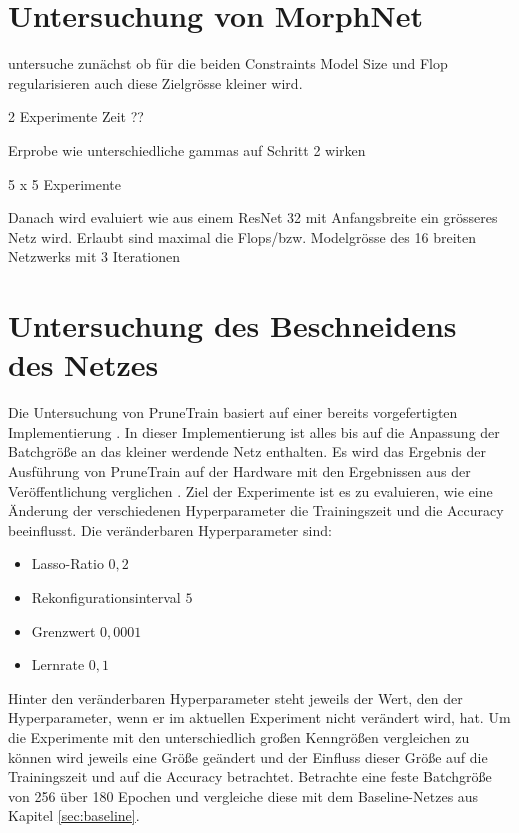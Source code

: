 \chapter{Untersuchung von MorphNet}\label{sec:morphexperimente}

untersuche zunächst ob für die beiden Constraints Model Size und Flop regularisieren auch diese Zielgrösse kleiner wird.

2 Experimente Zeit ??


Erprobe wie unterschiedliche gammas auf Schritt 2 wirken


5 x 5 Experimente 


Danach wird evaluiert wie aus einem ResNet 32 mit Anfangsbreite ein grösseres Netz wird. Erlaubt sind maximal die Flops/bzw. Modelgrösse des 16 breiten Netzwerks mit 3 Iterationen












\chapter{Untersuchung des Beschneidens des Netzes}\label{sec:ptexperimente}
\color{blue1}
Die Untersuchung von PruneTrain basiert auf einer bereits vorgefertigten Implementierung \cite{ptImpl}. In dieser Implementierung ist alles bis auf die Anpassung der Batchgröße an das kleiner werdende Netz enthalten. Es wird das Ergebnis der Ausführung von PruneTrain auf der Hardware mit den Ergebnissen aus der Veröffentlichung verglichen \cite{prunetrain}. Ziel der Experimente ist es zu evaluieren, wie eine Änderung der verschiedenen Hyperparameter die Trainingszeit und die Accuracy beeinflusst.
Die veränderbaren Hyperparameter sind:
\begin{itemize}
 \item Lasso-Ratio $0,2$
 \item Rekonfigurationsinterval $5$
 \item Grenzwert $0,0001$
 \item Lernrate $0,1$
\end{itemize}
Hinter den veränderbaren Hyperparameter steht jeweils der Wert, den der Hyperparameter, wenn er im aktuellen Experiment nicht verändert wird, hat.
Um die Experimente mit den unterschiedlich großen Kenngrößen vergleichen zu können wird jeweils eine Größe geändert und der Einfluss dieser Größe auf die Trainingszeit und auf die Accuracy betrachtet. Betrachte eine feste Batchgröße von 256 über 180 Epochen und vergleiche diese mit dem Baseline-Netzes aus Kapitel \ref{sec:baseline}. 


